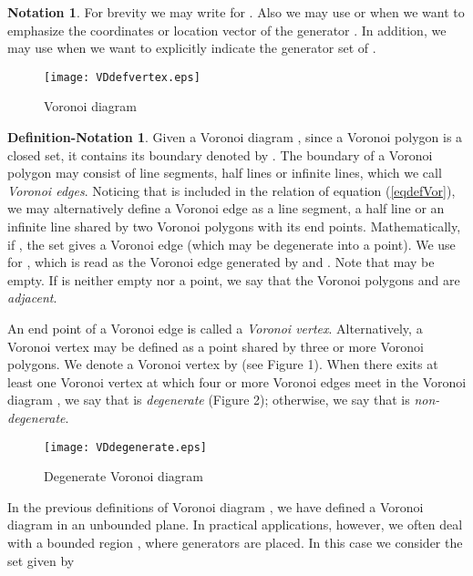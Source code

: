 \documentclass[a4paper,12pt]{article}
\newtheorem*{Condition 1}{Condition 1}
\newtheorem*{Condition 2}{Condition 2}
\theoremstyle{definition}
\newtheorem{notation}[thm]{Notation}
\newtheorem{defnotation}[thm]{Definition-Notation}
\theoremstyle{remark}
\begin{document}
\begin{notation}
For brevity we may write  for . Also we may use  or  when we want to emphasize the coordinates or location vector of the generator . In addition, we may use  when we want to explicitly indicate the generator set  of .
\end{notation}



\begin{figure}[htbp]
 \centering
 \begin{minipage}[c]{.45\textwidth}
{\texttt{[image: VDdefvertex.eps]}}
    \caption{Voronoi diagram}
  \end{minipage}

\end{figure}
\begin{defnotation}
Given a Voronoi diagram , since a Voronoi polygon is a closed set, it contains its boundary denoted by . The boundary of a Voronoi polygon may consist of line segments, half lines or infinite lines, which we call \emph{Voronoi edges}. Noticing that  is included in the relation of equation (\ref{eqdefVor}), we may alternatively define a Voronoi edge as a line segment, a half line or an infinite line shared by two Voronoi polygons with its end points. Mathematically, if , the set   gives a Voronoi edge (which may be degenerate into a point). We use  for , which is read as the Voronoi edge generated by  and . Note that  may be empty. If  is neither empty nor a point, we say that the Voronoi polygons  and  are \emph{adjacent}. 

An end point of a Voronoi edge is called a \emph{Voronoi vertex}. Alternatively, a Voronoi vertex may be defined as a point shared by three or more Voronoi polygons. We denote a Voronoi vertex by  (see Figure 1). When there exits at least one Voronoi vertex at which four or more Voronoi edges meet in the Voronoi diagram , we say that  is \emph{degenerate} (Figure 2); otherwise, we say that  is \emph{non-degenerate}. 
\end{defnotation}

\begin{figure}[htbp]
\centering
{\texttt{[image: VDdegenerate.eps]}}
    \caption{Degenerate Voronoi diagram}
\end{figure}



In the previous definitions of Voronoi diagram , we have defined a Voronoi diagram in an unbounded plane. In practical applications, however, we often deal with a bounded region , where generators are placed. In this case we consider the set given by
\end{document}
